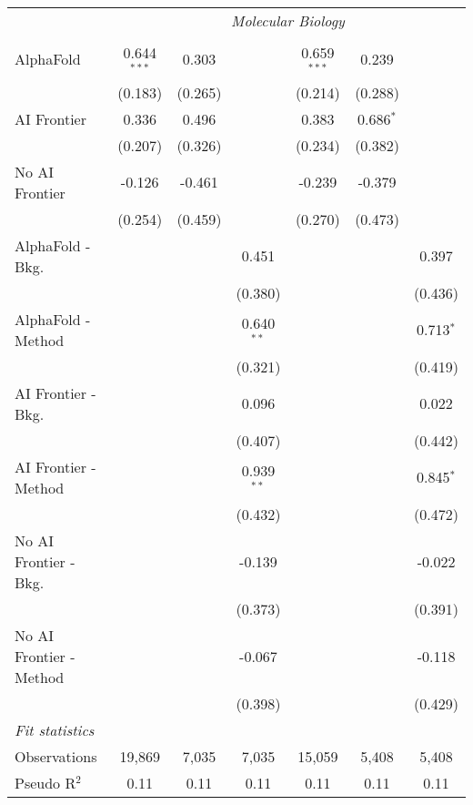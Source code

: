 \begin{tabular}{lcccccc}
 & \multicolumn{6}{c}{\textit{Molecular Biology}} \\ \\
   AlphaFold               & 0.644$^{***}$ & 0.303   &              & 0.659$^{***}$ & 0.239       &   \\   
                           & (0.183)       & (0.265) &              & (0.214)       & (0.288)     &   \\   
   AI Frontier             & 0.336         & 0.496   &              & 0.383         & 0.686$^{*}$ &   \\   
                           & (0.207)       & (0.326) &              & (0.234)       & (0.382)     &   \\   
   No AI Frontier          & -0.126        & -0.461  &              & -0.239        & -0.379      &   \\   
                           & (0.254)       & (0.459) &              & (0.270)       & (0.473)     &   \\   
   AlphaFold - Bkg.        &               &         & 0.451        &               &             & 0.397\\   
                           &               &         & (0.380)      &               &             & (0.436)\\   
   AlphaFold - Method      &               &         & 0.640$^{**}$ &               &             & 0.713$^{*}$\\   
                           &               &         & (0.321)      &               &             & (0.419)\\   
   AI Frontier - Bkg.      &               &         & 0.096        &               &             & 0.022\\   
                           &               &         & (0.407)      &               &             & (0.442)\\   
   AI Frontier - Method    &               &         & 0.939$^{**}$ &               &             & 0.845$^{*}$\\   
                           &               &         & (0.432)      &               &             & (0.472)\\   
   No AI Frontier - Bkg.   &               &         & -0.139       &               &             & -0.022\\   
                           &               &         & (0.373)      &               &             & (0.391)\\   
   No AI Frontier - Method &               &         & -0.067       &               &             & -0.118\\   
                           &               &         & (0.398)      &               &             & (0.429)\\   
   \midrule
   \emph{Fit statistics}\\
   Observations            & 19,869        & 7,035   & 7,035        & 15,059        & 5,408       & 5,408\\  
   Pseudo R$^2$            & 0.11          & 0.11    & 0.11         & 0.11          & 0.11        & 0.11\\  
   

\end{tabular}
